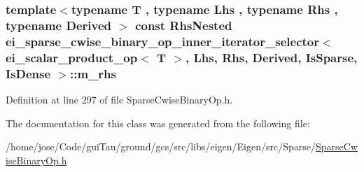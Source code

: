 \hypertarget{classei__sparse__cwise__binary__op__inner__iterator__selector_3_01ei__scalar__product__op_3_01_t68443256ad4d0dcd15264ea9d6adeadd_ad020918a7dc626d1b5b3e7e5b22258ca}{
\subsubsection[{m\-\_\-rhs}]{\setlength{\rightskip}{0pt plus 5cm}template$<$typename T , typename Lhs , typename Rhs , typename Derived $>$ const Rhs\-Nested {\bf ei\-\_\-sparse\-\_\-cwise\-\_\-binary\-\_\-op\-\_\-inner\-\_\-iterator\-\_\-selector}$<$ {\bf ei\-\_\-scalar\-\_\-product\-\_\-op}$<$ T $>$, Lhs, Rhs, Derived, {\bf Is\-Sparse}, {\bf Is\-Dense} $>$\-::m\-\_\-rhs\hspace{0.3cm}{\ttfamily [protected]}}}\label{classei__sparse__cwise__binary__op__inner__iterator__selector_3_01ei__scalar__product__op_3_01_t68443256ad4d0dcd15264ea9d6adeadd_ad020918a7dc626d1b5b3e7e5b22258ca}


Definition at line 297 of file Sparse\-Cwise\-Binary\-Op.\-h.



The documentation for this class was generated from the following file\-:\begin{DoxyCompactItemize}
\item 
/home/jose/\-Code/gui\-Tau/ground/gcs/src/libs/eigen/\-Eigen/src/\-Sparse/\hyperlink{_sparse_cwise_binary_op_8h}{Sparse\-Cwise\-Binary\-Op.\-h}\end{DoxyCompactItemize}
